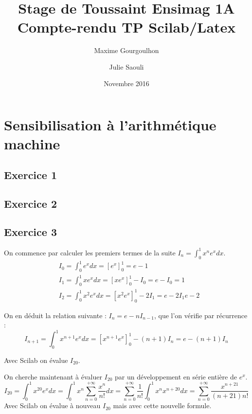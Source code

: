 \documentclass[a4paper,11pt]{article}
\title{Stage de Toussaint Ensimag 1A \\ Compte-rendu TP Scilab/Latex}
\author{Maxime Gourgoulhon \and Julie Saouli}
\date{Novembre 2016}
\begin{document}
\maketitle

\section{Sensibilisation à l'arithmétique machine}

\subsection*{Exercice 1}

\subsection*{Exercice 2}

\subsection*{Exercice 3}
	On commence par calculer les premiers termes de la suite $I_{n} = \int_0^1 x^{n} e^{x} dx$.
	\begin{align*}
		& I_{0} = \int_0^1 e^{x} dx = [e^{x}]_0^1 = e - 1 \\
		& I_{1} = \int_0^1 x e^{x} dx = [x e^{x}]_0^1 - I_{0} = e - I_{0} = 1 \\
		& I_{2} = \int_0^1 x^{2} e^{x} dx = [x^{2} e^{x}]_0^1 - 2I_{1} = e - 2I_{1} e - 2
	\end{align*}

	On en déduit la relation suivante : $I_{n} = e - nI_{n-1}$, que l'on vérifie par récurrence :
	\begin{equation*}
		I_{n+1} = \int_0^1 x^{n+1} e^{x} dx = [x^{n+1} e^{x}]_0^1 - (n+1) I_{n} = e - (n+1)I_{n}
	\end{equation*}

	Avec Scilab on évalue $I_{20}$.

	On cherche maintenant à évaluer $I_{20}$ par un développement en série entière de $e^{x}$.
	\begin{equation*}
		I_{20} = \int_0^1 x^{20} e^{x} dx
		= \int_0^1 x^{n} \sum_{n=0}^{+\infty} \frac{x^{n}}{n!} dx
		= \sum_{n=0}^{+\infty} \frac{1}{n!} \int_0^1 x^{n} x^{n+20} dx
		= \sum_{n=0}^{+\infty} \frac{x^{n+21}}{(n+21)n!}
	\end{equation*}
	Avec Scilab on évalue à nouveau $I_{20}$ mais avec cette nouvelle formule.
\end{document}
